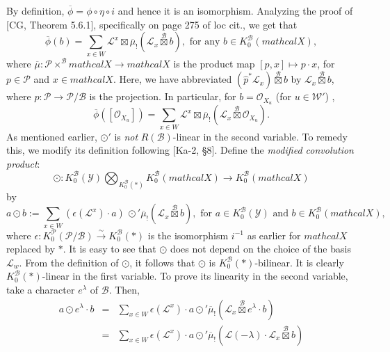 \documentclass[10pt,a4paper]{amsart}
\def\B{\mathcal{B}}
\def\L{\mathcal{L}}
\def\P{\mathcal{P}}
\def\W{\mathcal{W}}
\def\Y{\mathcal{Y}}
\newcommand{\X}{mathcal{X}}
\begin{document}
\begin{definition}
{By definition, $\overline{\phi}=\phi\circ \eta \circ i$ and hence it is an isomorphism. Analyzing the proof of [CG, Theorem 5.6.1], specifically on page 275 of loc cit., we get that 
\begin{equation}\label{4.8.1}
\overline{\phi} (b)=\sum_{x\in W} \L^x \boxtimes \overline{\mu}_! \left( \L_x \overset{\B}{\boxtimes} b\right), \mbox{ for any } b\in K_0^\B \left(\X\right),
\end{equation}
where $\overline{\mu}:\P\times^\B \X\rightarrow \X$ is the product map $[p,x]\mapsto p\cdot x$, for $p\in\P$ and $x\in \X$. Here, we have  abbreviated $\left(\hat{p}^* \L_x \right) \overset{\B}{\boxtimes} b$
by  $\L_x\overset{\B}{\boxtimes} b$, where $\hat{p}:\P\rightarrow \P/\B$ is the projection.
In particular,  for $b=\mathcal{O}_{X_u}$ (for $u\in \W'$) ,
\begin{equation}\label{4.8.2}
\overline{\phi} \left(\left[ \mathcal{O}_{X_u}\right]\right) = \sum_{x\in W} \L^x \boxtimes \overline{\mu}_! \left( \L_x \overset{\B}{\boxtimes}  \mathcal{O}_{X_u}\right). 
\end{equation}
As mentioned earlier, $\odot'$ is \textit{not} $R(\B)$-linear in the second variable. To remedy this, we modify its definition following [Ka-2, \S8].
Define the \textit{modified convolution product}: 
$$
\odot :K_0^\B \left( \Y\right) \bigotimes _{K_0^\B(*)} K_0^\B \left( \X\right) \rightarrow K_0^\B \left ( \X\right)
$$
by 
\begin{equation}\label{4.8.3}
a\odot b := \sum_{x\in W} \left(\epsilon \left(\L^x\right) \cdot a\right) \, \odot' \overline{\mu}_! \left(\L_x \overset{\B}{\boxtimes} b\right), \mbox{ for  } a\in K_0^\B\left(\Y\right) \mbox{ and } b \in K_0^\B\left(\X\right),
\end{equation}
where $\epsilon:K_0^\P \left(\P/\B\right)\overset{\sim}{\rightarrow}K_0^\B (*)$ is the isomorphism $i^{-1}$ as earlier  for $\X$ replaced by $*$. It is easy to see that $\odot$ does not depend on the choice of the basis $\L_w$. From the definition of $\odot$, it follows that $\odot$ is $K_0^\B(*)$-bilinear. It is clearly $K_0^\B(*)$-linear in the first variable. To prove its linearity in the second variable, take a character $e^\lambda$ of $\B$. Then, 
\begin{eqnarray*}
a\odot e^\lambda \cdot b &=& \sum_{x\in W}\epsilon \left(\L^x\right)\cdot a \odot' \overline{\mu}_!\left(\L_x \overset{\B}{\boxtimes} e^\lambda \cdot b\right)\\
&=& \sum_{x\in W}\epsilon \left(\L^x\right)\cdot a \odot' \overline{\mu}_!\left(\L(-\lambda)\cdot \L_x \overset{\B}{\boxtimes} b\right)\\

\end{eqnarray*}}
\end{definition}
\end{document}
